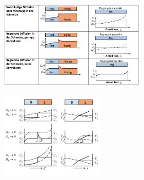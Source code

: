 \includegraphics[width = 70mm]{src/images/Diffusion1.png}

\begin{center}
    \includegraphics[width = 50mm]{src/images/Diffusion2.png}
\end{center}

